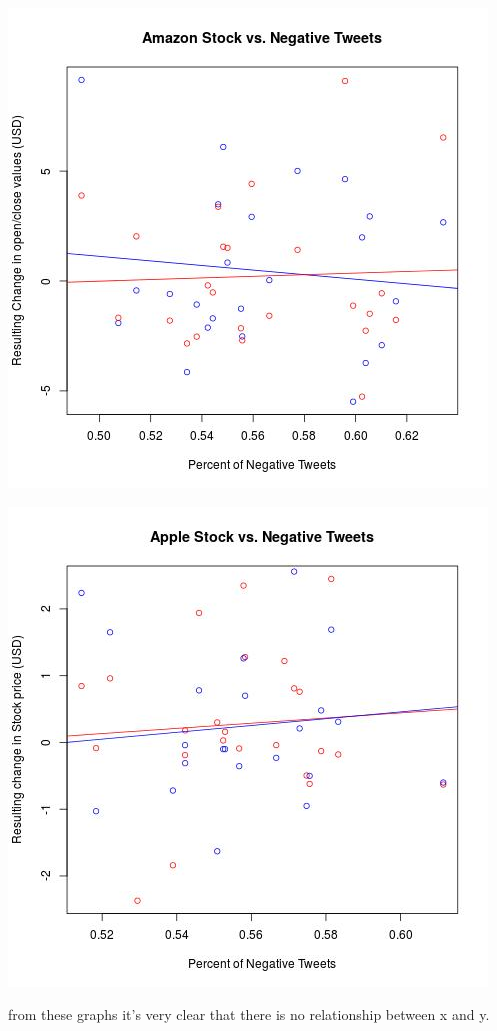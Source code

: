 \documentclass{acm_proc_article-sp}
\begin{document}
\includegraphics[scale=.5]{amazon_negative.jpeg}

\includegraphics[scale=.5]{apple_negative.jpeg} 

\indent from these graphs it's very clear that there is no relationship between x and y.
\end{document}
